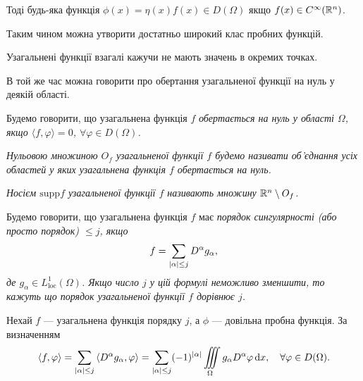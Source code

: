 Тоді будь-яка функція $\phi(x) = \eta(x) f(x) \in D(\Omega)$ якщо $f(x) \in C^\infty(\mathbb{R}^n)$. \medskip

Таким чином можна утворити достатньо широкий клас пробних функцій.
\begin{remark}
	Узагальнені функції взагалі кажучи не мають значень в окремих точках. \medskip

	В той же час можна говорити про обертання узагальненої функції на нуль у деякій області.
\end{remark}

\begin{definition}
	Будемо говорити, що узагальнена функція $f$ \it{обертається на нуль} у області $\Omega$, якщо $\langle f, \varphi \rangle = 0$, $\forall \varphi \in D(\Omega)$.
\end{definition} 

\begin{definition}
	\it{Нульовою множиною} $O_f$ узагальненої функції $f$ будемо називати об'єднання усіх областей у яких узагальнена функція $f$ обертається на нуль. 
\end{definition}

\begin{definition}
	\it{Носієм} $\text{supp} f$ узагальненої функції $f$ називають множину $\mathbb{R}^n \setminus O_f$.
\end{definition}

\begin{definition}
	Будемо говорити, що узагальнена функція $f$ має \it{порядок сингулярності} (або просто порядок) $\le j$, якщо
	\begin{equation}
		f = \displaystyle\sum\limits_{|\alpha| \le j} D^\alpha g_\alpha,	
	\end{equation}
	де $g_\alpha \in L_{\text{loc}}^1 (\Omega)$. Якщо число $j$ у цій формулі неможливо зменшити, то кажуть що порядок узагальненої функції $f$ \it{дорівнює} $j$.
\end{definition}

Нехай $f$ --- узагальнена функція порядку $j$, а $\phi$ --- довільна пробна функція. За визначенням
\begin{equation}
	\langle f, \phi \rangle = \Sum_{|\alpha| \le j} \langle D^\alpha g_\alpha, \phi \rangle = \Sum_{|\alpha| \le j} (-1)^{|\alpha|} \Iiint_\Omega g_\alpha D^\alpha \phi \diff x, \quad \forall \phi \in D(\Omega).
\end{equation}

